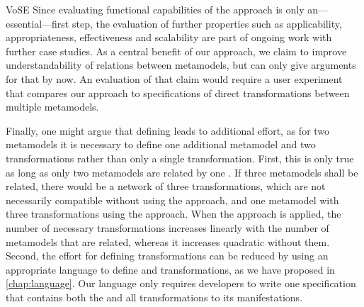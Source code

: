 \begin{copiedFrom}{VoSE}
Since evaluating functional capabilities of the approach is only an---essential---first step, the evaluation of further properties such as applicability, appropriateness, effectiveness and scalability are part of ongoing work with further case studies.
As a central benefit of our approach, we claim to improve understandability of relations between metamodels, but can only give arguments for that by now.
An evaluation of that claim would require a user experiment that compares our approach to specifications of direct transformations between multiple metamodels.

Finally, one might argue that defining \conceptmetamodels leads to additional effort, as for two metamodels it is necessary to define one additional metamodel and two transformations rather than only a single transformation.
First, this is only true as long as only two metamodels are related by one \conceptmetamodel. 
If three metamodels shall be related, there would be a network of three transformations, which are not necessarily compatible without using the \commonalities approach, and one metamodel with three transformations using the \commonalities approach.
When the \commonalities approach is applied, the number of necessary transformations increases linearly with the number of metamodels that are related, whereas it increases quadratic without them.
Second, the effort for defining transformations can be reduced by using an appropriate language to define \conceptmetamodels and transformations, as we have proposed in \autoref{chap:language}. Our language only requires developers to write one specification that contains both the \conceptmetamodel and all transformations to its manifestations.


\end{copiedFrom} %


